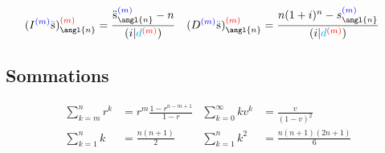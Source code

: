 \documentclass[10pt, french]{article}
\newcommand\cumlaut[2][black]{\stackon[.33ex]{#2}{\textcolor{#1}{\kern-.04ex.\kern-.2ex.}}}
\begin{document}
\begin{multicols*}{3}
\begin{align*}
	(I^{\textcolor{blue}{(m)}}\cumlaut[cyan]{s})_{\angl{n}}^{\textcolor{red}{(m)}} 
		&= \frac{\cumlaut[black]{s}_{\angl{n}}^{\textcolor{blue}{(m)}} - n}{(i | \textcolor{cyan}{d}^{\textcolor{red}{(m)}})} &
	(D^{\textcolor{blue}{(m)}}\cumlaut[cyan]{s})_{\angl{n}}^{\textcolor{red}{(m)}} 
		&= \frac{n(1+i)^{n} - s_{\angl{n}}^{\textcolor{blue}{(m)}}}{(i | \textcolor{cyan}{d}^{\textcolor{red}{(m)}})} 
\end{align*}




\subsection*{Sommations}
\begin{align*}
\sum_{k = m}^{n} r^k &= r^{m} \frac{1 - r^{n - m + 1}}{1 - r} &
\sum_{k = 0}^{\infty}k v^k &= \frac{v}{(1 - v)^2} \\
\sum_{k = 1}^{n}k &= \frac{n(n + 1)}{2} &
\sum_{k = 1}^{n}k^2 &= \frac{n(n + 1)(2n + 1)}{6} \\
\end{align*}


\end{multicols*}
\end{document}
